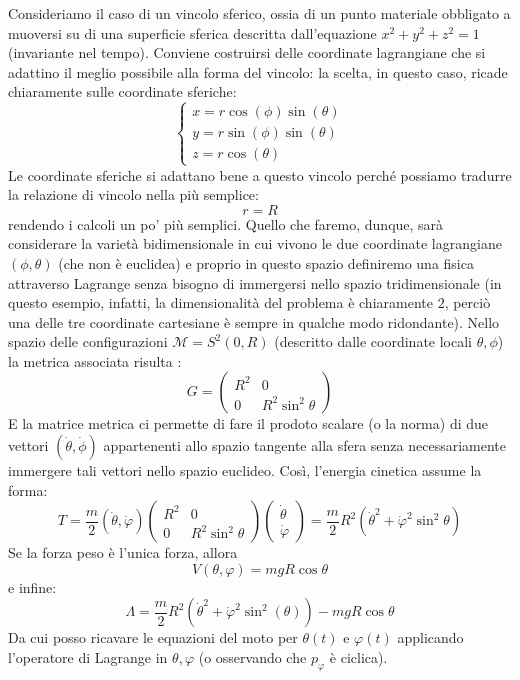 \documentclass[a4paper,openany]{article}
\begin{document}
	Consideriamo il caso di un vincolo sferico, ossia di un punto materiale obbligato a muoversi su di una superficie sferica descritta dall'equazione $x^{2}+y^{2}+z^{2} = 1$ (invariante nel tempo). Conviene costruirsi delle coordinate lagrangiane che si adattino il meglio possibile alla forma del vincolo: la scelta, in questo caso, ricade chiaramente sulle coordinate sferiche:
	\begin{equation}
		\begin{cases}
			x = r \cos(\phi)\sin(\theta) \\
			y = r \sin(\phi)\sin(\theta) \\
			z = r \cos(\theta)
		\end{cases}
	\end{equation}
	Le coordinate sferiche si adattano bene a questo vincolo perché possiamo tradurre la relazione di vincolo nella più semplice:
	$$
	r = R
	$$
	rendendo i calcoli un po' più semplici. Quello che faremo, dunque, sarà considerare la varietà bidimensionale in cui vivono le due coordinate lagrangiane $(\phi,\theta)$ (che non è euclidea) e proprio in questo spazio definiremo una fisica attraverso Lagrange senza bisogno di immergersi nello spazio tridimensionale (in questo esempio, infatti, la dimensionalità del problema è chiaramente $2$, perciò una delle tre coordinate cartesiane è sempre in qualche modo ridondante). Nello spazio delle configurazioni $\mathcal{M} = S^{2}(0,R)$ (descritto dalle coordinate locali $\theta,\phi$) la metrica associata risulta :
	\begin{equation}
		G = 
		\begin{pmatrix}
			R^{2} & 0 \\
			0 & R^{2}\sin^{2}\theta
		\end{pmatrix}
	\end{equation}
	E la matrice metrica ci permette di fare il prodoto scalare (o la norma) di due vettori $(\dot{\theta},\dot{\phi})$ appartenenti allo spazio tangente alla sfera senza necessariamente immergere tali vettori nello spazio euclideo. Così, l'energia cinetica assume la forma:
	\begin{equation}
		T = \dfrac{m}{2}(\dot{\theta},\dot{\varphi})
		\begin{pmatrix}
			R^{2} & 0 \\
			0 & R^{2}\sin^{2}\theta
		\end{pmatrix}
		\begin{pmatrix}
			\dot{\theta}\\
			\dot{\varphi}
		\end{pmatrix}
		= \dfrac{m}{2}R^{2}(\dot{\theta}^{2}+\dot{\varphi}^{2}\sin^{2}\theta)
	\end{equation}
	Se la forza peso è l'unica forza, allora 
	$$
	V(\theta,\varphi) = mgR\cos\theta
	$$
	e infine:
	$$
	\Lambda = \dfrac{m}{2}R^{2}(\dot{\theta}^{2}+\dot{\varphi}^{2}\sin^{2}(\theta)) - mgR\cos\theta
	$$
	Da cui posso ricavare le equazioni del moto per $\theta(t)$ e $\varphi(t)$ applicando l'operatore di Lagrange in $\theta, \varphi$ (o osservando che $p_{\varphi}$ è ciclica). 
\end{document}
